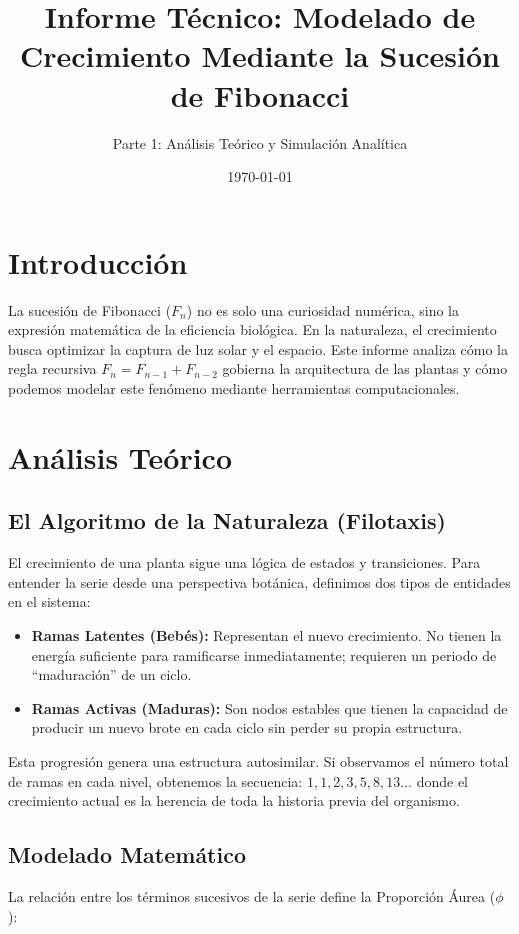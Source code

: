 \documentclass[12pt,a4paper]{article}
\title{Informe Técnico: Modelado de Crecimiento Mediante la Sucesión de Fibonacci}
\author{Parte 1: Análisis Teórico y Simulación Analítica}
\date{\today}
\begin{document}
\maketitle

\section{Introducción}
La sucesión de Fibonacci ($F_n$) no es solo una curiosidad numérica, sino la expresión matemática de la eficiencia biológica. En la naturaleza, el crecimiento busca optimizar la captura de luz solar y el espacio. Este informe analiza cómo la regla recursiva $F_n = F_{n-1} + F_{n-2}$ gobierna la arquitectura de las plantas y cómo podemos modelar este fenómeno mediante herramientas computacionales.

\section{Análisis Teórico}

\subsection{El Algoritmo de la Naturaleza (Filotaxis)}
El crecimiento de una planta sigue una lógica de estados y transiciones. Para entender la serie desde una perspectiva botánica, definimos dos tipos de entidades en el sistema:

\begin{itemize}
    \item \textbf{Ramas Latentes (Bebés):} Representan el nuevo crecimiento. No tienen la energía suficiente para ramificarse inmediatamente; requieren un periodo de ``maduración'' de un ciclo.
    \item \textbf{Ramas Activas (Maduras):} Son nodos estables que tienen la capacidad de producir un nuevo brote en cada ciclo sin perder su propia estructura.
\end{itemize}

Esta progresión genera una estructura autosimilar. Si observamos el número total de ramas en cada nivel, obtenemos la secuencia: $1, 1, 2, 3, 5, 8, 13 \dots$ donde el crecimiento actual es la herencia de toda la historia previa del organismo.

\subsection{Modelado Matemático}
La relación entre los términos sucesivos de la serie define la Proporción Áurea ($\phi$):
\end{document}
